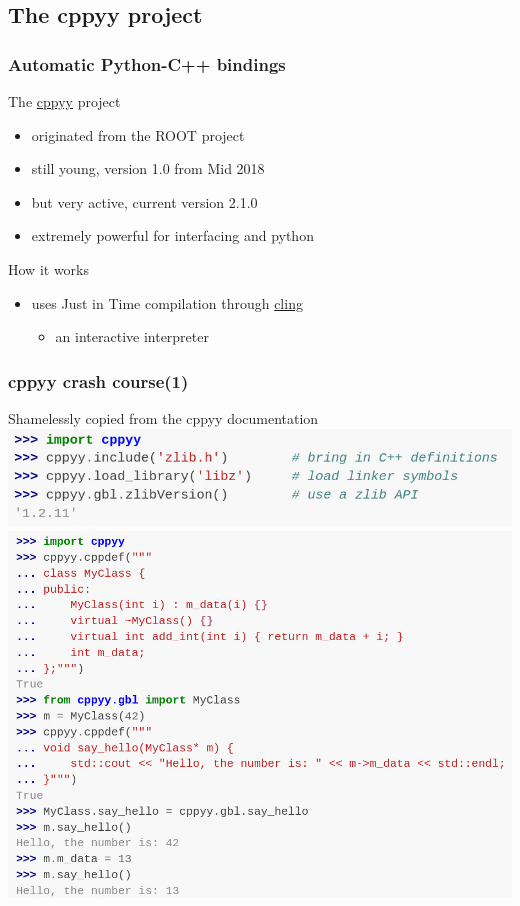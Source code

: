 \subsection[cppyy]{The cppyy project}

\begin{frame}
  \frametitle{Automatic Python-C++ bindings}
  \begin{block}{The {\color{blue!50!white} \href{https://cppyy.readthedocs.io}{cppyy}} project}
    \begin{itemize}
    \item originated from the ROOT project
    \item still young, version 1.0 from Mid 2018
    \item but very active,  current version 2.1.0
    \item extremely powerful for interfacing \cpp and python
    \end{itemize}
  \end{block}
  \begin{block}{How it works}
    \begin{itemize}
    \item uses Just in Time compilation through {\color{blue!50!black} \href{https://github.com/vgvassilev/cling}{cling}}
      \begin{itemize}
      \item an interactive \cpp interpreter
      \end{itemize}
    \end{itemize}
  \end{block}
\end{frame}

\begin{frame}
  \frametitle{cppyy crash course(1)}
  Shamelessly copied from the cppyy documentation
  \includegraphics[width=.8\textwidth]{python/cppyy2.png}
  \includegraphics[trim={0 3.2cm 0 0},clip,width=\textwidth]{python/cppyy.png}
\end{frame}

